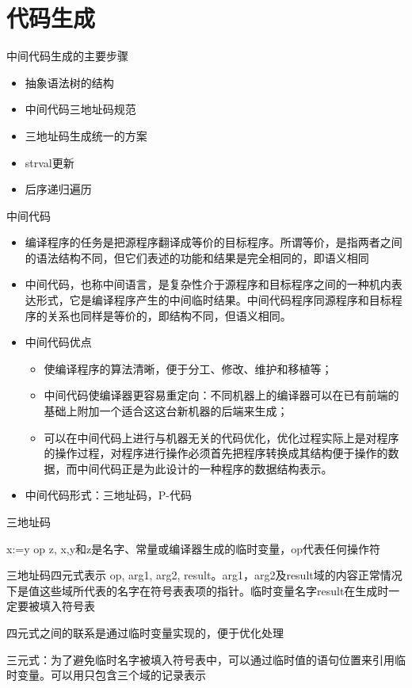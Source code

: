 \documentclass[utf8]{ctexart}
\begin{document}
\section{代码生成}

中间代码生成的主要步骤
\begin{itemize}
    \item 抽象语法树的结构
    \item 中间代码三地址码规范
    \item 三地址码生成统一的方案
    \item strval更新
    \item 后序递归遍历
\end{itemize}

中间代码
\begin{itemize}
    \item 编译程序的任务是把源程序翻译成等价的目标程序。所谓等价，是指两者之间的语法结构不同，但它们表述的功能和结果是完全相同的，即语义相同
    \item 中间代码，也称中间语言，是复杂性介于源程序和目标程序之间的一种机内表达形式，它是编译程序产生的中间临时结果。中间代码程序同源程序和目标程序的关系也同样是等价的，即结构不同，但语义相同。
    \item 中间代码优点
    \begin{itemize}
        \item 使编译程序的算法清晰，便于分工、修改、维护和移植等；
        \item 中间代码使编译器更容易重定向：不同机器上的编译器可以在已有前端的基础上附加一个适合这这台新机器的后端来生成；
        \item 可以在中间代码上进行与机器无关的代码优化，优化过程实际上是对程序的操作过程，对程序进行操作必须首先把程序转换成其结构便于操作的数据，而中间代码正是为此设计的一种程序的数据结构表示。
    \end{itemize}  
    \item 中间代码形式：三地址码，P-代码
\end{itemize}

三地址码

x:=y op z, x,y和z是名字、常量或编译器生成的临时变量，op代表任何操作符

三地址码四元式表示 op, arg1, arg2, result。arg1，arg2及result域的内容正常情况下是值这些域所代表的名字在符号表表项的指针。临时变量名字result在生成时一定要被填入符号表

四元式之间的联系是通过临时变量实现的，便于优化处理

三元式：为了避免临时名字被填入符号表中，可以通过临时值的语句位置来引用临时变量。可以用只包含三个域的记录表示
\end{document}
